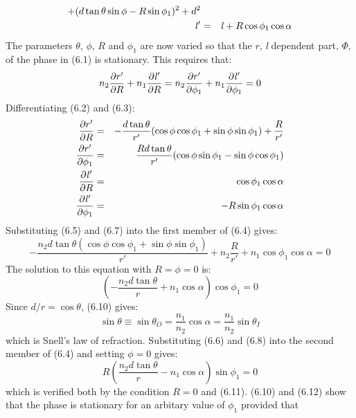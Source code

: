 {\begin{eqnarray}
      + (d \tan \theta \sin \phi -R \sin \phi_1)^2+d^2 \\
   {\it l}' & = &  {\it l} +R \cos \phi_1 \cos \alpha
  \end{eqnarray}
    The parameters $\theta$, $\phi$, $R$ and $\phi_1$ are now varied so that the $r$, {\it l}
 dependent part, $\Phi$, of the phase in (6.1) is stationary. This requires that:
   \begin{equation}
  n_2 \frac{\partial r'}{\partial R}+ n_1\frac{\partial {\it l}' }{\partial R}
  =   n_2\frac{\partial r'}{\partial \phi_1}+ n_1\frac{\partial {\it l}' }{\partial \phi_1} = 0
  \end{equation}  
  Differentiating (6.2) and (6.3):
  \begin{eqnarray}
   \frac{\partial  r'}{\partial  R}  & = &  -\frac{d \tan \theta}{r'}(\cos \phi \cos \phi_1+ \sin \phi \sin \phi_1)
    +\frac{R}{r'} \\
  \frac{\partial  r'}{\partial \phi_1}  & = &  \frac{R d \tan \theta}{r'}(\cos \phi \sin \phi_1
    - \sin \phi \cos \phi_1) \\
  \frac{\partial {\it l}' }{\partial  R}  & = &   \cos \phi_1 \cos \alpha  \\
 \frac{\partial {\it l}' }{\partial \phi_1}  & = &   -R \sin \phi_1 \cos \alpha 
  \end{eqnarray} 
   Substituting (6.5) and (6.7) into the first member of (6.4) gives:
   \begin{equation}
  -\frac{n_2 d \tan \theta (\cos \phi \cos \phi_1+ \sin \phi \sin \phi_1)}{r'} + n_2 \frac{R}{r'}
   + n_1 \cos \phi_1 \cos \alpha = 0
 \end{equation}
  The solution to this equation with $R= \phi = 0$ is:
   \begin{equation}
  (-\frac{n_2 d \tan \theta }{r} + n_1 \cos \alpha) \cos \phi_1  = 0
 \end{equation}
 Since $d/r = \cos \theta$, (6.10) gives:
  \begin{equation}
   \sin \theta \equiv \sin \theta_O = \frac {n_1}{n_2} \cos \alpha =  \frac {n_1}{n_2} \sin \theta_I
\end{equation}
 which is Snell's law of refraction.
 Substituting (6.6) and (6.8) into the second member of (6.4) and setting $\phi = 0$ gives:
 \begin{equation}
  R(\frac{n_2 d \tan \theta }{r}- n_1 \cos \alpha) \sin \phi_1 = 0
\end{equation}
 which is verified both by the condition $R = 0$ and (6.11). (6.10) and (6.12) 
  show that the phase is stationary for an arbitary value of $\phi_1$ provided that 
}
